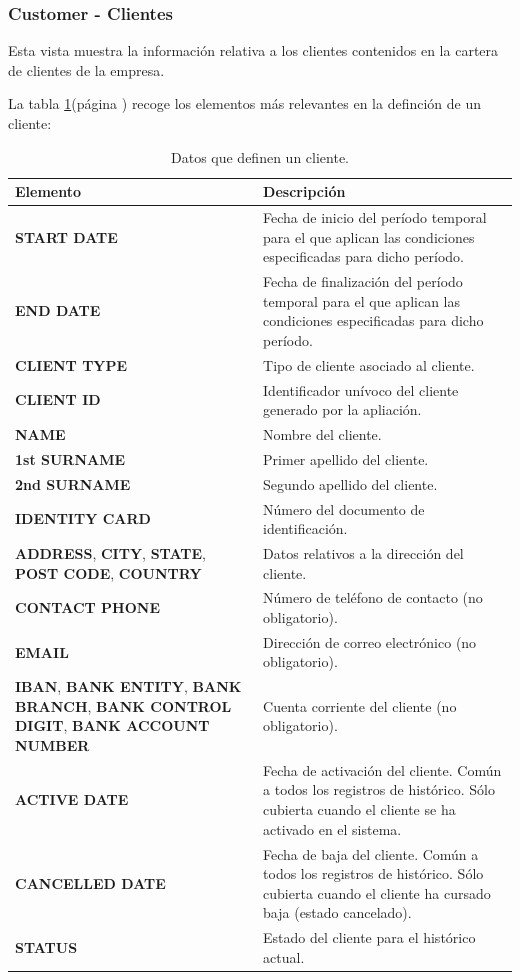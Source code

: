 \subsubsection{Customer - Clientes}
\label{sub:customer}

Esta vista muestra la información relativa a los clientes contenidos en la cartera de clientes de la empresa.


La tabla \ref{tab:cliente}(página \pageref{tab:cliente}) recoge los elementos más relevantes en la definción de un cliente:

\begin{table}[H]
  \centering
  \setlength{\leftmargini}{0.4cm}
  \resizebox{14cm}{!} {
  \begin{tabular}{|m{6cm} m{8cm}|}
  \rowcolor{udcpink!25}
  \hline
  	\textbf{Elemento} & \textbf{Descripción} \\\hline
  	\textbf{START DATE} & Fecha de inicio del período temporal para el que aplican las condiciones especificadas para dicho período.\\
  	\textbf{END DATE} & Fecha de finalización del período temporal para el que aplican las condiciones especificadas para dicho período.\\
	\textbf{CLIENT TYPE} & Tipo de cliente asociado al cliente.\\
	\textbf{CLIENT ID} & Identificador unívoco del cliente generado por la apliación.\\
	\textbf{NAME} & Nombre del cliente.\\
	\textbf{1st SURNAME} & Primer apellido del cliente.\\
	\textbf{2nd SURNAME} & Segundo apellido del cliente.\\
	\textbf{IDENTITY CARD} & Número del documento de identificación.\\	
	\textbf{ADDRESS}, \textbf{CITY}, \textbf{STATE}, \textbf{POST CODE}, \textbf{COUNTRY}  & Datos relativos a la dirección del cliente.\\	
	\textbf{CONTACT PHONE} & Número de teléfono de contacto (no obligatorio).\\
	\textbf{EMAIL} & Dirección de correo electrónico (no obligatorio).\\
	\textbf{IBAN}, \textbf{BANK ENTITY}, \textbf{BANK BRANCH}, \textbf{BANK CONTROL DIGIT}, \textbf{BANK ACCOUNT NUMBER} & Cuenta corriente del cliente (no obligatorio).\\
	\textbf{ACTIVE DATE} & Fecha de activación del cliente. Común a todos los registros de histórico. Sólo cubierta cuando el cliente se ha activado en el sistema.\\
	\textbf{CANCELLED DATE} & Fecha de baja del cliente. Común a todos los registros de histórico. Sólo cubierta cuando el cliente ha cursado baja (estado cancelado).\\	
	\textbf{STATUS} & Estado del cliente para el histórico actual.	
	\\\hline
  \end{tabular}
  } %
  \caption{Datos que definen un cliente.}
  \label{tab:cliente}
\end{table}



